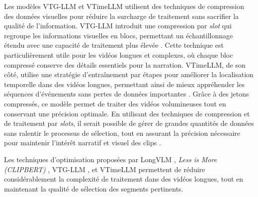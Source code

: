 Les modèles VTG-LLM \cite{guo2024_vtgllm} et VTimeLLM \cite{huang2024_vtimellm} utilisent des techniques de compression des données visuelles pour réduire la surcharge de traitement sans sacrifier la qualité de l’information. VTG-LLM introduit une compression par \textit{slot} qui regroupe les informations visuelles en blocs, permettant un échantillonnage étendu avec une capacité de traitement plus élevée \cite{guo2024_vtgllm}. Cette technique est particulièrement utile pour les vidéos longues et complexes, où chaque bloc compressé conserve des détails essentiels pour la narration. VTimeLLM, de son côté, utilise une stratégie d’entraînement par étapes pour améliorer la localisation temporelle dans des vidéos longues, permettant ainsi de mieux appréhender les séquences d’événements sans pertes de données importantes \cite{huang2024_vtimellm}. Grâce à des jetons compressés, ce modèle permet de traiter des vidéos volumineuses tout en conservant une précision optimale. En utilisant des techniques de compression et de traitement par \textit{slots}, il serait possible de gérer de grandes quantités de données sans ralentir le processus de sélection, tout en assurant la précision nécessaire pour maintenir l’intérêt narratif et visuel des clips \cite{guo2024_vtgllm}\cite{huang2024_vtimellm}.

Les techniques d’optimisation proposées par LongVLM \cite{weng2024}, \textit{Less is More (CLIPBERT)} \cite{lei2021_clipbert}, VTG-LLM \cite{guo2024_vtgllm}, et VTimeLLM \cite{huang2024_vtimellm} permettent de réduire considérablement la complexité de traitement dans des vidéos longues, tout en maintenant la qualité de sélection des segments pertinents. 


